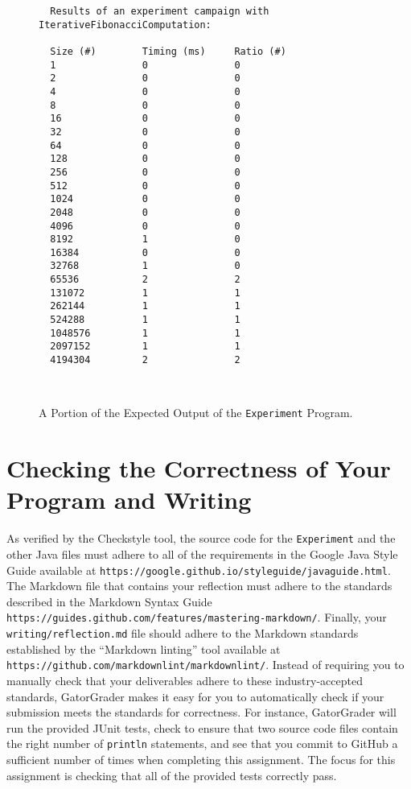 \documentclass[11pt]{article}
\newcommand{\mainprogram}{\lstinline{Experiment}}
\newcommand{\reflection}{\lstinline{writing/reflection.md}}
\newcommand{\program}[1]{\lstinline{#1}}
\newcommand{\url}[1]{\lstinline{#1}}
\newcommand{\step}[1]{``{#1}''}
\begin{document}
\begin{figure}[t]
  \centering
  \begin{verbatim}
  Results of an experiment campaign with IterativeFibonacciComputation:

  Size (#)        Timing (ms)     Ratio (#)
  1               0               0
  2               0               0
  4               0               0
  8               0               0
  16              0               0
  32              0               0
  64              0               0
  128             0               0
  256             0               0
  512             0               0
  1024            0               0
  2048            0               0
  4096            0               0
  8192            1               0
  16384           0               0
  32768           1               0
  65536           2               2
  131072          1               1
  262144          1               1
  524288          1               1
  1048576         1               1
  2097152         1               1
  4194304         2               2
  \end{verbatim}
  \vspace*{-.35in}
  \caption{A Portion of the Expected Output of the \mainprogram{} Program.}~\label{fig:output}
  \vspace*{-.25in}
\end{figure}

\section*{Checking the Correctness of Your Program and Writing}

As verified by the Checkstyle tool, the source code for the \mainprogram{} and
the other Java files must adhere to all of the requirements in the Google Java
Style Guide available at
\url{https://google.github.io/styleguide/javaguide.html}. The Markdown file that
contains your reflection must adhere to the standards described in the Markdown
Syntax Guide \url{https://guides.github.com/features/mastering-markdown/}.
Finally, your \reflection{} file should adhere to the Markdown standards
established by the \step{Markdown linting} tool available at
\url{https://github.com/markdownlint/markdownlint/}. Instead of requiring you to
manually check that your deliverables adhere to these industry-accepted
standards, GatorGrader makes it easy for you to automatically check if your
submission meets the standards for correctness. For instance, GatorGrader will
run the provided JUnit tests, check to ensure that two source code files contain
the right number of \program{println} statements, and see that you commit to
GitHub a sufficient number of times when completing this assignment. The focus
for this assignment is checking that all of the provided tests correctly pass.
\end{document}
